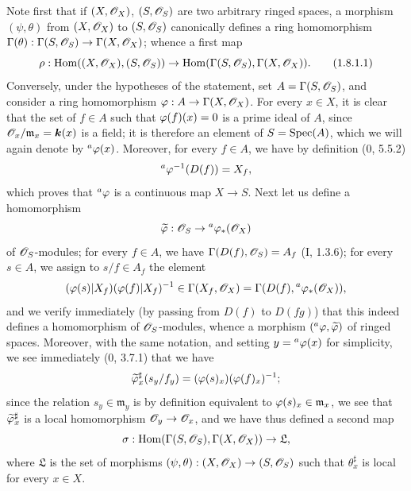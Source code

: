 Note first that if $(X,\mathscr{O}_X)$, $(S,\mathscr{O}_S)$ are two arbitrary
ringed spaces, a morphism $(\psi,\theta)$ from $(X,\mathscr{O}_X)$
to $(S,\mathscr{O}_S)$ canonically defines a ring homomorphism
$\Gamma(\theta):\Gamma(S,\mathscr{O}_S)\to\Gamma(X,\mathscr{O}_X)$; whence a
first map
\begin{equation}
\label{ega2:addendum:I.1.8.1.1}
  \rho:\operatorname{Hom}((X,\mathscr{O}_X),(S,\mathscr{O}_S))
  \to\operatorname{Hom}(\Gamma(S,\mathscr{O}_S),\Gamma(X,\mathscr{O}_X)).
\tag{1.8.1.1}
\end{equation}
Conversely, under the hypotheses of the statement, set
$A=\Gamma(S,\mathscr{O}_S)$, and consider a ring homomorphism
$\varphi:A\to\Gamma(X,\mathscr{O}_X)$. For every $x\in X$, it is clear that
the set of $f\in A$ such that $\varphi(f)(x)=0$ is a prime ideal
of $A$, since $\mathscr{O}_x/\mathfrak m_x=\boldsymbol{k}(x)$ is a field; it is
therefore an element of $S=\operatorname{Spec}(A)$, which we will again denote by
${}^a\varphi(x)$. Moreover, for every $f\in A$, we have by definition
(0, 5.5.2)
\[
  {}^a\varphi^{-1}(D(f))=X_f,
\]
which proves that ${}^a\varphi$ is a continuous map $X\to S$.
Next let us define a homomorphism
\[
  \widetilde{\varphi}:\mathscr{O}_S\to{}^a\varphi_*(\mathscr{O}_X)
\]
of $\mathscr{O}_S$-modules; for every $f\in A$, we have
$\Gamma(D(f),\mathscr{O}_S)=A_f$ (I, 1.3.6); for every $s\in A$, we assign
to $s/f\in A_f$ the element
\[
  (\varphi(s)|X_f)(\varphi(f)|X_f)^{-1}
  \in\Gamma(X_f,\mathscr{O}_X)
  =\Gamma(D(f),{}^a\varphi_*(\mathscr{O}_X)),
\]
and we verify immediately (by passing from $D(f)$ to $D(fg)$) that this
indeed defines a homomorphism of $\mathscr{O}_S$-modules, whence a morphism
$({}^a\varphi,\widetilde{\varphi})$ of ringed spaces. Moreover, with the
same notation, and setting $y={}^a\varphi(x)$ for simplicity, we see
immediately (0, 3.7.1) that we have
\[
  \widetilde{\varphi}_x^\sharp(s_y/f_y)
  =(\varphi(s)_x)(\varphi(f)_x)^{-1};
\]
since the relation $s_y\in\mathfrak m_y$ is by definition equivalent
to $\varphi(s)_x\in\mathfrak m_x$, we see that
$\widetilde{\varphi}_x^\sharp$ is a local homomorphism
$\mathscr{O}_y\to\mathscr{O}_x$, and we have thus defined a second map
\[
  \sigma:\operatorname{Hom}(\Gamma(S,\mathscr{O}_S),\Gamma(X,\mathscr{O}_X))\to\mathfrak L,
\]
where $\mathfrak L$ is the set of morphisms
$(\psi,\theta):(X,\mathscr{O}_X)\to(S,\mathscr{O}_S)$ such that
$\theta_x^\sharp$ is local for every $x\in X$.

